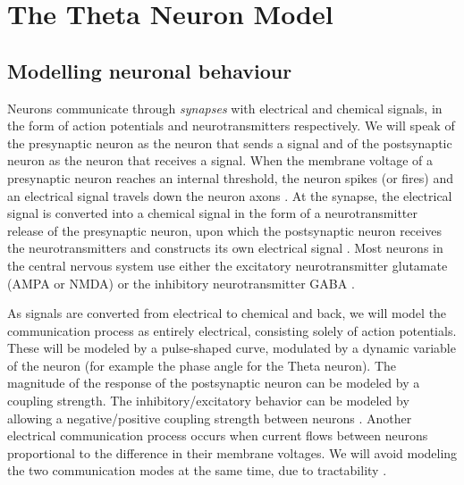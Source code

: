 \newpage
\section{The Theta Neuron Model} \label{TheThetaNeuronModel}
\subsection{Modelling neuronal behaviour}
Neurons communicate through \textsl{synapses} with electrical and chemical signals, in the form of action potentials and neurotransmitters respectively. We will speak of the presynaptic neuron as the neuron that sends a signal and of the postsynaptic neuron as the neuron that receives a signal. When the membrane voltage of a presynaptic neuron reaches an internal threshold, the neuron spikes (or fires) and an electrical signal travels down the neuron axons \cite{IntroductionModelingDynamics}. At the synapse, the electrical signal is converted into a chemical signal in the form of a neurotransmitter release of the presynaptic neuron, upon which the postsynaptic neuron receives the neurotransmitters and constructs its own electrical signal \cite{ActionPotentialsAndSynapses}. Most neurons in the central nervous system use either the excitatory neurotransmitter glutamate (AMPA or NMDA) or the inhibitory neurotransmitter GABA \cite{MathFoundationNeuroscience, Zhang2012}. 

As signals are converted from electrical to chemical and back, we will model the communication process as entirely electrical, consisting solely of action potentials. These will be modeled by a pulse-shaped curve, modulated by a dynamic variable of the neuron (for example the phase angle for the Theta neuron). The magnitude of the response of the postsynaptic neuron can be modeled by a coupling strength. The inhibitory/excitatory behavior can be modeled by allowing a negative/positive coupling strength between neurons \cite{Luke2013, Martens2020, Montbrio2015, OttAntonsen2017}.
Another electrical communication process occurs when current flows between neurons proportional to the difference in their membrane voltages. We will avoid modeling the two communication modes at the same time, due to tractability \cite{Martens2020}. 



